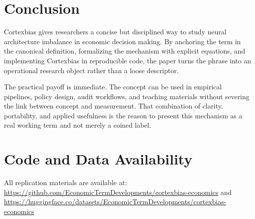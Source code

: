 \documentclass[12pt]{article}
\begin{document}
\section{Conclusion}
Cortexbias gives researchers a concise but disciplined way to study neural architecture imbalance in economic decision making. By anchoring the term in the canonical definition, formalizing the mechanism with explicit equations, and implementing Cortexbias in reproducible code, the paper turns the phrase into an operational research object rather than a loose descriptor.

The practical payoff is immediate. The concept can be used in empirical pipelines, policy design, audit workflows, and teaching materials without severing the link between concept and measurement. That combination of clarity, portability, and applied usefulness is the reason to present this mechanism as a real working term and not merely a coined label.

\section*{Code and Data Availability}
All replication materials are available at:
\url{https://github.com/EconomicTermDevelopments/cortexbias-economics} and
\url{https://huggingface.co/datasets/EconomicTermDevelopments/cortexbias-economics}
\end{document}
